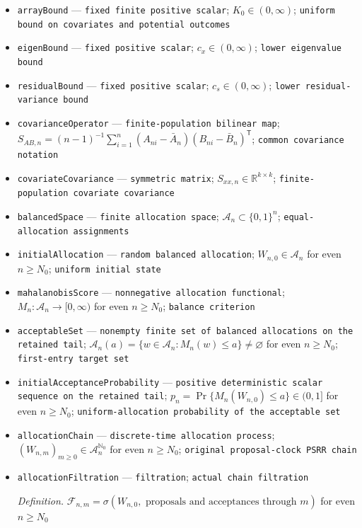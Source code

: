 \documentclass{article}
\begin{document}
\begin{itemize}
  \item \texttt{arrayBound} --- \texttt{fixed finite positive scalar}; \(K_0\in(0,\infty)\); \texttt{uniform bound on covariates and potential outcomes}
  \item \texttt{eigenBound} --- \texttt{fixed positive scalar}; \(c_x\in(0,\infty)\); \texttt{lower eigenvalue bound}
  \item \texttt{residualBound} --- \texttt{fixed positive scalar}; \(c_s\in(0,\infty)\); \texttt{lower residual-\allowbreak{}variance bound}
  \item \texttt{covarianceOperator} --- \texttt{finite-\allowbreak{}population bilinear map}; \(S_{AB,n}=(n-1)^{-1}\sum_{i=1}^n(A_{ni}-\bar A_n)(B_{ni}-\bar B_n)^{\mathsf T}\); \texttt{common covariance notation}
  \item \texttt{covariateCovariance} --- \texttt{symmetric matrix}; \(S_{xx,n}\in\mathbb R^{k\times k}\); \texttt{finite-\allowbreak{}population covariate covariance}
  \item \texttt{balancedSpace} --- \texttt{finite allocation space}; \(\mathcal A_n\subset\{0,1\}^n\); \texttt{equal-\allowbreak{}allocation assignments}
  \item \texttt{initialAllocation} --- \texttt{random balanced allocation}; \(W_{n,0}\in\mathcal A_n\) for even \(n\ge N_0\); \texttt{uniform initial state}
  \item \texttt{mahalanobisScore} --- \texttt{nonnegative allocation functional}; \(M_n:\mathcal A_n\to[0,\infty)\) for even \(n\ge N_0\); \texttt{balance criterion}
  \item \texttt{acceptableSet} --- \texttt{nonempty finite set of balanced allocations on the retained tail}; \(\mathcal A_n(a)=\{w\in\mathcal A_n:M_n(w)\le a\}\neq\varnothing\) for even \(n\ge N_0\); \texttt{first-\allowbreak{}entry target set}
  \item \texttt{initialAcceptanceProbability} --- \texttt{positive deterministic scalar sequence on the retained tail}; \(p_n=\Pr\{M_n(W_{n,0})\le a\}\in(0,1]\) for even \(n\ge N_0\); \texttt{uniform-\allowbreak{}allocation probability of the acceptable set}
  \item \texttt{allocationChain} --- \texttt{discrete-\allowbreak{}time allocation process}; \((W_{n,m})_{m\ge0}\in\mathcal A_n^{\mathbb N_0}\) for even \(n\ge N_0\); \texttt{original proposal-\allowbreak{}clock PSRR chain}
  \item \texttt{allocationFiltration} --- \texttt{filtration}; \texttt{actual chain filtration}
  \par\smallskip\noindent\emph{Definition.} \(\mathcal F_{n,m}=\sigma(W_{n,0},\text{ proposals and acceptances through }m)\) for even \(n\ge N_0\)

\end{itemize}
\end{document}
